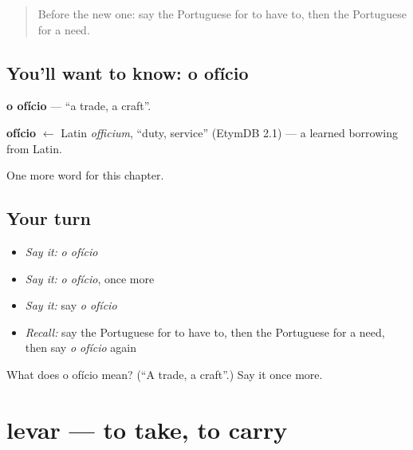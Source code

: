 \label{lesson:PT-C82-oficio}



\begin{quote}
Before the new one: say the Portuguese for to have to, then the Portuguese for a need.
\end{quote}

\subsection*{You'll want to know: o ofício}
\textbf{o ofício} — \textquotedblleft{}a trade, a craft\textquotedblright{}.

\begin{cousinweb}
\textbf{ofício} $\leftarrow$ Latin \emph{officium}, \textquotedblleft{}duty, service\textquotedblright{} (EtymDB 2.1) — a learned borrowing from Latin.
\end{cousinweb}

\begin{grammarlens}[title={What you've built}]
One more word for this chapter.
\end{grammarlens}

\subsection*{Your turn}
\begin{itemize}
\raggedright
  \item \emph{Say it:} \emph{o ofício}
  \item \emph{Say it:} \emph{o ofício}, once more
  \item \emph{Say it:} say \emph{o ofício}
  \item \emph{Recall:} say the Portuguese for to have to, then the Portuguese for a need, then say \emph{o ofício} again
\end{itemize}

\begin{tcolorbox}[breakable,colback=teal!4,colframe=teal!35!black,title={Before you move on}]
What does o ofício mean? (\textquotedblleft{}A trade, a craft\textquotedblright{}.) Say it once more.
\end{tcolorbox}
\section[levar]{levar — to take, to carry}

\label{lesson:PT-C82-levar}



